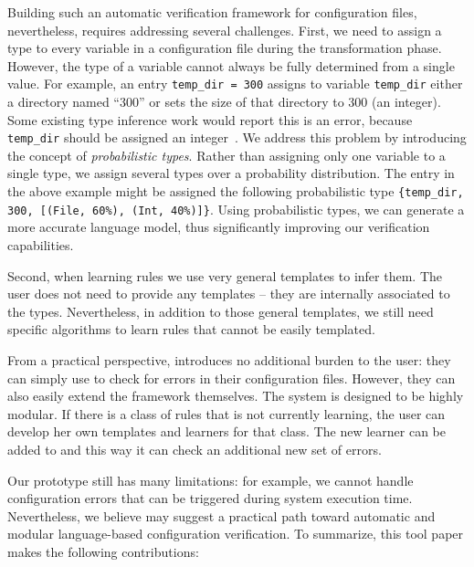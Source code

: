 Building such an automatic verification framework for
configuration files, nevertheless, requires addressing several challenges. 
First, we need to assign a type to every variable in a configuration file during the transformation phase.
However,
the type of a variable cannot always be fully determined 
from a single value. 
For example, an entry {\tt temp\_dir = 300} assigns to variable {\tt temp\_dir} either a directory named ``300'' or sets the size of that directory to 300 (an integer).
Some existing type inference 
work would report this is an error, because {\tt temp\_dir} should be assigned
an integer~\cite{zhang14encore}. We address this problem by introducing the concept of
{\emph{probabilistic types}}.
Rather than assigning only one variable to a single type, 
we assign several types over a probability distribution. 
The entry in the above example might be assigned 
the following probabilistic type
{\tt \{temp\_dir, 300, [(File, 60\%), (Int, 40\%)]\}}.
Using probabilistic types,
we can generate a more accurate language model,
thus significantly improving our verification capabilities.

Second, when learning rules we use very general templates to 
infer them. The user does not need to provide any templates -- they are internally associated to the types.
Nevertheless, in addition to those general templates, we still need specific algorithms to learn
rules that cannot be easily templated. 


From a practical perspective, 
\app introduces no additional burden 
to the user: they can simply use \app to check for errors in their
configuration files. However, they can also easily extend the framework
themselves. The system is designed to be highly modular. If there is a
class of rules that \app is not currently learning, the user can develop
her own templates and learners for that class. The new learner can be
added to \app and this way it can check an additional new set of
errors.

Our \app prototype still has many limitations:
for example, we cannot handle configuration errors that can be 
triggered during system execution time.
Nevertheless, we believe \app may suggest a practical path
toward automatic and modular language-based configuration verification.
To summarize, this tool paper makes the following contributions:

